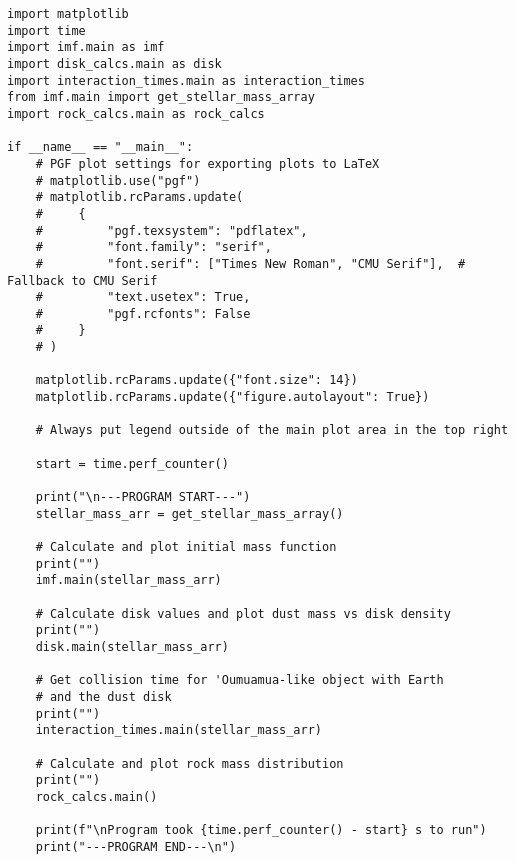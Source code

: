 \begin{lstlisting}
import matplotlib
import time
import imf.main as imf
import disk_calcs.main as disk
import interaction_times.main as interaction_times
from imf.main import get_stellar_mass_array
import rock_calcs.main as rock_calcs

if __name__ == "__main__":
    # PGF plot settings for exporting plots to LaTeX
    # matplotlib.use("pgf")
    # matplotlib.rcParams.update(
    #     {
    #         "pgf.texsystem": "pdflatex",
    #         "font.family": "serif",
    #         "font.serif": ["Times New Roman", "CMU Serif"],  #  Fallback to CMU Serif
    #         "text.usetex": True,
    #         "pgf.rcfonts": False
    #     }
    # )

    matplotlib.rcParams.update({"font.size": 14})
    matplotlib.rcParams.update({"figure.autolayout": True})

    # Always put legend outside of the main plot area in the top right

    start = time.perf_counter()

    print("\n---PROGRAM START---")
    stellar_mass_arr = get_stellar_mass_array()

    # Calculate and plot initial mass function
    print("")
    imf.main(stellar_mass_arr)

    # Calculate disk values and plot dust mass vs disk density
    print("")
    disk.main(stellar_mass_arr)

    # Get collision time for 'Oumuamua-like object with Earth
    # and the dust disk
    print("")
    interaction_times.main(stellar_mass_arr)

    # Calculate and plot rock mass distribution
    print("")
    rock_calcs.main()

    print(f"\nProgram took {time.perf_counter() - start} s to run")
    print("---PROGRAM END---\n")
\end{lstlisting}